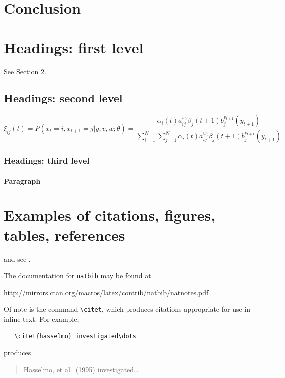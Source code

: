 \documentclass{article}
\begin{document}
\section{Conclusion}
\label{sec:conclusion}
\lipsum[2]
\lipsum[3]

\section{Headings: first level}
\label{sec:headings}

\lipsum[4] See Section \ref{sec:headings}.

\subsection{Headings: second level}
\lipsum[5]
\begin{equation}
\xi _{ij}(t)=P(x_{t}=i,x_{t+1}=j|y,v,w;\theta)= {\frac {\alpha _{i}(t)a^{w_t}_{ij}\beta _{j}(t+1)b^{v_{t+1}}_{j}(y_{t+1})}{\sum _{i=1}^{N} \sum _{j=1}^{N} \alpha _{i}(t)a^{w_t}_{ij}\beta _{j}(t+1)b^{v_{t+1}}_{j}(y_{t+1})}}
\end{equation}

\subsubsection{Headings: third level}
\lipsum[6]

\paragraph{Paragraph}
\lipsum[7]

\section{Examples of citations, figures, tables, references}
\label{sec:others}
\lipsum[8] \cite{kour2014real,kour2014fast} and see \cite{hadash2018estimate}.

The documentation for \verb+natbib+ may be found at
\begin{center}
  \url{http://mirrors.ctan.org/macros/latex/contrib/natbib/natnotes.pdf}
\end{center}
Of note is the command \verb+\citet+, which produces citations
appropriate for use in inline text.  For example,
\begin{verbatim}
   \citet{hasselmo} investigated\dots
\end{verbatim}
produces
\begin{quote}
  Hasselmo, et al.\ (1995) investigated\dots
\end{quote}
\end{document}
